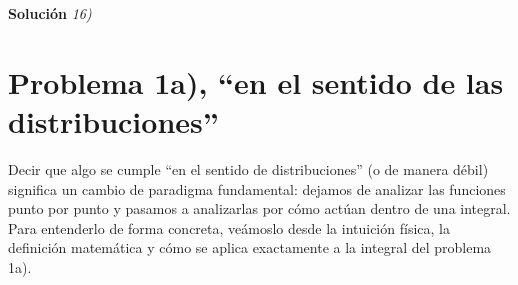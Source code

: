 \documentclass[11pt,spanish]{article}
\newcounter{problema}
\begin{document}
\vspace{0.5cm}
{\bf Soluci\'on }{\em 16)}
\vspace{0.5cm}





 
%
%

\appendix

\section{Problema 1a), ``en el sentido de las distribuciones''}

Decir que algo se cumple ``en el sentido de distribuciones'' (o de manera débil) significa un cambio de paradigma fundamental: dejamos de analizar las funciones punto por punto y pasamos a analizarlas por cómo actúan dentro de una integral.
Para entenderlo de forma concreta, veámoslo desde la intuición física, la definición matemática y cómo se aplica exactamente a la integral del problema 1a).
\end{document}
